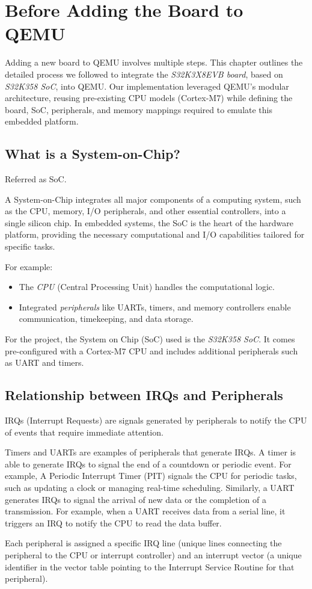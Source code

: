 \chapter{Before Adding the Board to QEMU}

Adding a new board to QEMU involves multiple steps. This chapter outlines the detailed process we followed to integrate the \textit{S32K3X8EVB board}, based on \textit{S32K358 SoC}, into QEMU. Our implementation leveraged QEMU’s modular architecture, reusing pre-existing CPU models (Cortex-M7) while defining the board, SoC, peripherals, and memory mappings required to emulate this embedded platform. 

\section{What is a System-on-Chip?}
\begin{center}
    Referred as SoC.
\end{center}
A System-on-Chip integrates all major components of a computing system, such as the CPU, memory, I/O peripherals, and other essential controllers, into a single silicon chip. In embedded systems, the SoC is the heart of the hardware platform, providing the necessary computational and I/O capabilities tailored for specific tasks. 

\vspace{0.2cm}

\noindent For example:
\begin{itemize}
    \item The \textit{CPU} (Central Processing Unit) handles the computational logic.
    \item Integrated \textit{peripherals} like UARTs, timers, and memory controllers enable communication, timekeeping, and data storage.
\end{itemize}

\vspace{0.2cm}

\noindent For the project, the System on Chip (SoC) used is the \textit{S32K358 SoC}. It comes pre-configured with a Cortex-M7 CPU and includes additional peripherals such as UART and timers.

\section{Relationship between IRQs and Peripherals}
\begin{center}
    IRQs (Interrupt Requests) are signals generated by peripherals to notify the CPU of events that require immediate attention.
\end{center}
Timers and UARTs are examples of peripherals that generate IRQs. A timer is able to generate IRQs to signal the end of a countdown or periodic event. For example, A Periodic Interrupt Timer (PIT) signals the CPU for periodic tasks, such as updating a clock or managing real-time scheduling. Similarly, a UART generates IRQs to signal the arrival of new data or the completion of a transmission. For example, when a UART receives data from a serial line, it triggers an IRQ to notify the CPU to read the data buffer.

\vspace{0.5cm}

\noindent Each peripheral is assigned a specific IRQ line (unique lines connecting the peripheral to the CPU or interrupt controller) and an interrupt vector (a unique identifier in the vector table pointing to the Interrupt Service Routine for that peripheral). 